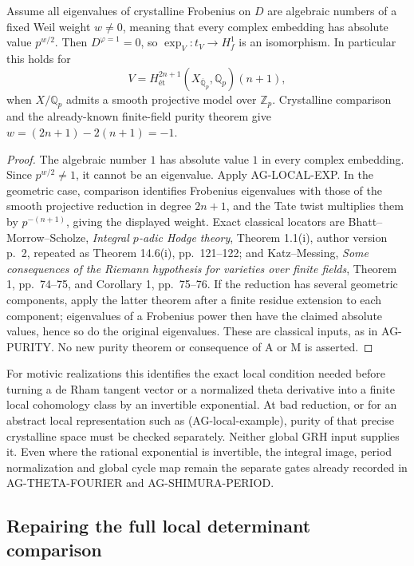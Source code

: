 \begin{proposition}
Assume all eigenvalues of crystalline Frobenius on $D$ are
algebraic numbers of a fixed Weil weight $w\ne0$, meaning
that every complex embedding has absolute value $p^{w/2}$.
Then $D^{\varphi=1}=0$, so $\exp_V:t_V\to H_f^1$ is an
isomorphism.  In particular this holds for
\[
 V=H^{2n+1}_{\text{ét}}
       (X_{\overline{\mathbb Q}_p},\mathbb Q_p)(n+1),
\]
when $X/\mathbb Q_p$ admits a smooth projective model over
$\mathbb Z_p$.  Crystalline comparison and the already-known
finite-field purity theorem give
$w=(2n+1)-2(n+1)=-1$.
\end{proposition}
\begin{proof}
The algebraic number $1$ has absolute value $1$ in every
complex embedding.  Since $p^{w/2}\ne1$, it cannot be an
eigenvalue.  Apply AG-LOCAL-EXP.  In the geometric case,
comparison identifies Frobenius eigenvalues with those of
the smooth projective reduction in degree $2n+1$, and the
Tate twist multiplies them by $p^{-(n+1)}$, giving the
displayed weight.  Exact classical locators are
Bhatt--Morrow--Scholze, \emph{Integral $p$-adic Hodge theory},
Theorem 1.1(i), author version p.~2, repeated as
Theorem 14.6(i), pp.~121--122; and Katz--Messing,
\emph{Some consequences of the Riemann hypothesis for varieties
over finite fields}, Theorem 1, pp.~74--75, and
Corollary 1, pp.~75--76.  If the reduction has several
geometric components, apply the latter theorem after a
finite residue extension to each component; eigenvalues
of a Frobenius power then have the claimed absolute
values, hence so do the original eigenvalues.
These are classical inputs, as in AG-PURITY.  No new purity
theorem or consequence of A or M is asserted.
\end{proof}

For motivic realizations this identifies the exact local
condition needed before turning a de Rham tangent vector
or a normalized theta derivative into a finite local
cohomology class by an invertible exponential.  At bad
reduction, or for an abstract local representation such
as (AG-local-example), purity of that precise crystalline
space must be checked separately.  Neither global GRH
input supplies it.  Even where the rational exponential
is invertible, the integral image, period normalization
and global cycle map remain the separate gates already
recorded in AG-THETA-FOURIER and AG-SHIMURA-PERIOD.

\subsection{Repairing the full local determinant comparison}

